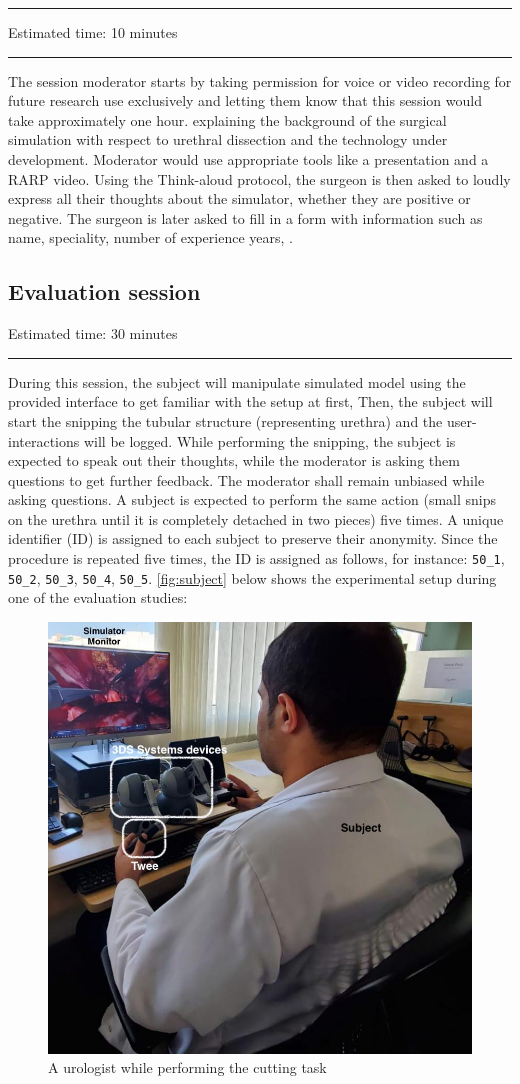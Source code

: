 \hrule
Estimated time: 10 minutes\\[-2ex]
\hrule%
The session moderator starts by taking permission for voice or video recording for future research use exclusively and letting them know that this session would take approximately one hour.  explaining the background of the surgical simulation with respect to urethral dissection and the technology under development. Moderator would use appropriate tools like a presentation and a RARP video. Using the Think-aloud protocol, the surgeon is then asked to loudly express all their thoughts about the simulator, whether they are positive or negative. The surgeon is later asked to fill in a form with information such as name, speciality, number of experience years, \etc.

\subsection{Evaluation session}
Estimated time: 30 minutes\\[-2ex]
\hrule%
During this session, the subject will manipulate simulated model using the provided interface to get familiar with the setup at first, Then, the subject will start the snipping the tubular structure (representing urethra) and the user-interactions will be logged.
While performing the snipping, the subject is expected to speak out their thoughts, while the moderator is asking them questions to get further feedback. The moderator shall remain unbiased while asking questions.
A subject is expected to perform the same action (small snips on the urethra until it is completely detached in two pieces) five times.
A unique identifier (ID) is assigned to each subject to preserve their anonymity. Since the procedure is repeated five times, the ID is assigned as follows, for instance: \texttt{50\_1}, \texttt{50\_2}, \texttt{50\_3}, \texttt{50\_4}, \texttt{50\_5}. \autoref{fig:subject} below shows the experimental setup during one of the evaluation studies:

\begin{figure}
  \centering
  \includegraphics[width=.7\textwidth,frame]{figures/validation/subject.jpeg}
  \caption{A urologist while performing the cutting task}
  \label{fig:subject}
\end{figure}

